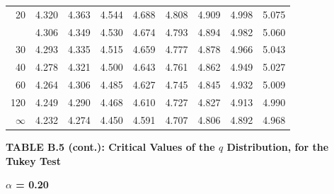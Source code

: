 \documentclass[10pt]{article}
\begin{document}
\begin{longtable}{@{}r!{\vrule width 0.8pt\hspace{0.55em}}rrrrrrrr@{}}
20 & 4.320 & 4.363 & 4.544 & 4.688 & 4.808 & 4.909 & 4.998 & 5.075 \\
 & 4.306 & 4.349 & 4.530 & 4.674 & 4.793 & 4.894 & 4.982 & 5.060 \\
30 & 4.293 & 4.335 & 4.515 & 4.659 & 4.777 & 4.878 & 4.966 & 5.043 \\
40 & 4.278 & 4.321 & 4.500 & 4.643 & 4.761 & 4.862 & 4.949 & 5.027 \\
60 & 4.264 & 4.306 & 4.485 & 4.627 & 4.745 & 4.845 & 4.932 & 5.009 \\
120 & 4.249 & 4.290 & 4.468 & 4.610 & 4.727 & 4.827 & 4.913 & 4.990 \\
\addlinespace[0.30em]
$\infty$ & 4.232 & 4.274 & 4.450 & 4.591 & 4.707 & 4.806 & 4.892 & 4.968 \\
\end{longtable}
\newpage
\thispagestyle{empty}
\begin{center}
{\large\bfseries TABLE B.5 (cont.): Critical Values of the $q$ Distribution, for the Tukey Test\par}
\end{center}
{\large\bfseries $\alpha$ = 0.20\par}
\vspace{0.45em}
\small
\end{document}

